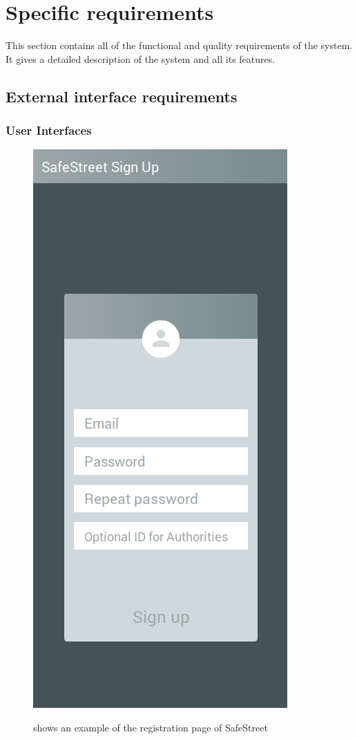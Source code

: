 \documentclass[../RASD.tex]{subfiles}
\begin{document}
    \chapter{Specific requirements}\label{ch:specific-requirements}
    This section contains all of the functional and quality requirements of the system. It gives a detailed description of the system and all its features.
        \section{External interface requirements}\label{sec:external-interface-requirements}
            \subsection{User Interfaces}\label{subsec:user-interfaces}
    \begin{figure}[H]
        \centering
        \includegraphics[scale = 0.4]{assets/signup.png}\\[1.6 cm]
        \caption[\textit{User} Sign Up \textit{Mockup}]{shows an example of the registration page of SafeStreet}
    \end{figure}
\end{document}
